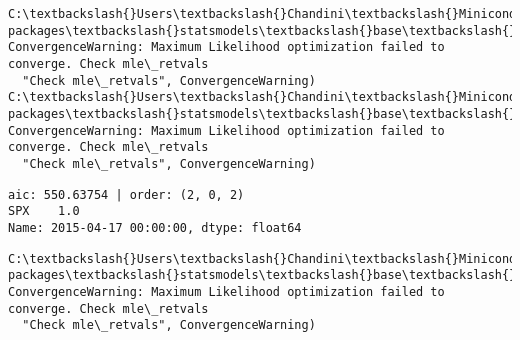 \documentclass[11pt]{article}
\begin{document}
    \begin{Verbatim}[commandchars=\\\{\}]
C:\textbackslash{}Users\textbackslash{}Chandini\textbackslash{}Miniconda3\textbackslash{}envs\textbackslash{}auquan\textbackslash{}lib\textbackslash{}site-packages\textbackslash{}statsmodels\textbackslash{}base\textbackslash{}model.py:496: ConvergenceWarning: Maximum Likelihood optimization failed to converge. Check mle\_retvals
  "Check mle\_retvals", ConvergenceWarning)
C:\textbackslash{}Users\textbackslash{}Chandini\textbackslash{}Miniconda3\textbackslash{}envs\textbackslash{}auquan\textbackslash{}lib\textbackslash{}site-packages\textbackslash{}statsmodels\textbackslash{}base\textbackslash{}model.py:496: ConvergenceWarning: Maximum Likelihood optimization failed to converge. Check mle\_retvals
  "Check mle\_retvals", ConvergenceWarning)

    \end{Verbatim}

    \begin{Verbatim}[commandchars=\\\{\}]
aic: 550.63754 | order: (2, 0, 2)
SPX    1.0
Name: 2015-04-17 00:00:00, dtype: float64

    \end{Verbatim}

    \begin{Verbatim}[commandchars=\\\{\}]
C:\textbackslash{}Users\textbackslash{}Chandini\textbackslash{}Miniconda3\textbackslash{}envs\textbackslash{}auquan\textbackslash{}lib\textbackslash{}site-packages\textbackslash{}statsmodels\textbackslash{}base\textbackslash{}model.py:496: ConvergenceWarning: Maximum Likelihood optimization failed to converge. Check mle\_retvals
  "Check mle\_retvals", ConvergenceWarning)

    \end{Verbatim}
\end{document}
